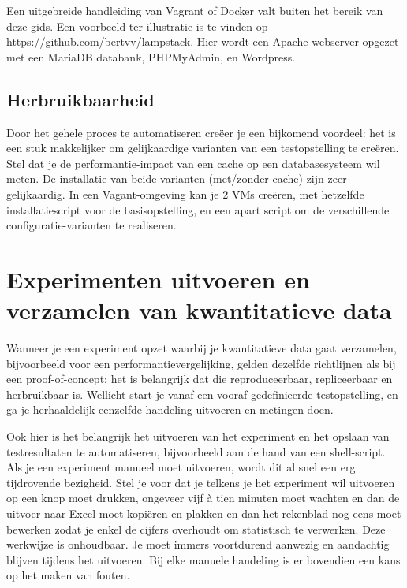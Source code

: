 Een uitgebreide handleiding van Vagrant of Docker valt buiten het bereik van deze gids. Een voorbeeld ter illustratie is te vinden op \url{https://github.com/bertvv/lampstack}. Hier wordt een Apache webserver opgezet met een MariaDB databank, PHPMyAdmin, en Wordpress.

\subsection{Herbruikbaarheid}
\label{ssec:herbruikbaarheid}

Door het gehele proces te automatiseren creëer je een bijkomend voordeel: het is een stuk makkelijker om gelijkaardige varianten van een testopstelling te creëren. Stel dat je de performantie-impact van een cache op een databasesysteem wil meten. De installatie van beide varianten (met/zonder cache) zijn zeer gelijkaardig. In een Vagant-omgeving kan je 2 VMs creëren, met hetzelfde installatiescript voor de basisopstelling, en een apart script om de verschillende configuratie-varianten te realiseren.

\section{Experimenten uitvoeren en verzamelen van kwantitatieve data}
\label{sec:experimenten-uitvoeren}

Wanneer je een experiment opzet waarbij je kwantitatieve data gaat verzamelen, bijvoorbeeld voor een performantievergelijking, gelden dezelfde richtlijnen als bij een proof-of-concept: het is belangrijk dat die reproduceerbaar, repliceerbaar en herbruikbaar is. Wellicht start je vanaf een vooraf gedefinieerde testopstelling, en ga je herhaaldelijk eenzelfde handeling uitvoeren en metingen doen.

Ook hier is het belangrijk het uitvoeren van het experiment en het opslaan van testresultaten te automatiseren, bijvoorbeeld aan de hand van een shell-script. Als je een experiment manueel moet uitvoeren, wordt dit al snel een erg tijdrovende bezigheid. Stel je voor dat je telkens je het experiment wil uitvoeren op een knop moet drukken, ongeveer vijf à tien minuten moet wachten en dan de uitvoer naar Excel moet kopiëren en plakken en dan het rekenblad nog eens moet bewerken zodat je enkel de cijfers overhoudt om statistisch te verwerken. Deze werkwijze is onhoudbaar. Je moet immers voortdurend aanwezig en aandachtig blijven tijdens het uitvoeren. Bij elke manuele handeling is er bovendien een kans op het maken van fouten.

